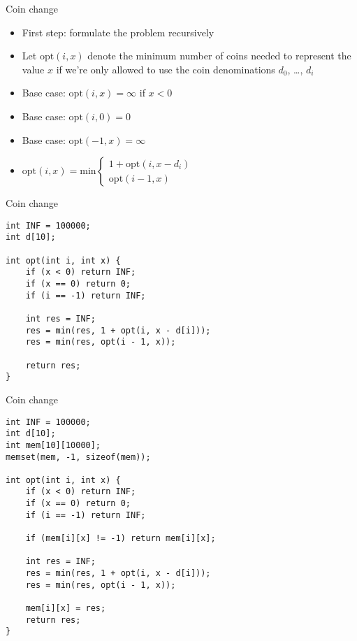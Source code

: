 \documentclass[12pt,t]{beamer}
\newcommand{\bi}{\begin{itemize}}
\newcommand{\ei}{\end{itemize}}
\begin{document}
\begin{frame}{Coin change}
    \bi
        \item First step: formulate the problem recursively
        \vspace{20pt}
\item Let $\mathrm{opt}(i,x)$ denote the minimum number of coins needed to represent the value $x$ if we're only allowed to use the coin denominations $d_0$, \ldots, $d_i$
        \vspace{10pt}
        \item Base case: $\mathrm{opt}(i,x) = \infty$ if $x < 0$
        \item Base case: $\mathrm{opt}(i,0) = 0$
        \item Base case: $\mathrm{opt}(-1,x) = \infty$
        \vspace{10pt}
\item $\mathrm{opt}(i,x) = \mathrm{min} \left\{
	\begin{array}{l}
        1 + \mathrm{opt}(i, x - d_i) \\
        \mathrm{opt}(i-1, x)
	\end{array}
\right.$
    \ei
\end{frame}

\begin{frame}[fragile]{Coin change}
    \begin{verbatim}
int INF = 100000;
int d[10];

int opt(int i, int x) {
    if (x < 0) return INF;
    if (x == 0) return 0;
    if (i == -1) return INF;

    int res = INF;
    res = min(res, 1 + opt(i, x - d[i]));
    res = min(res, opt(i - 1, x));

    return res;
}
    \end{verbatim}
\end{frame}

\begin{frame}[fragile]{Coin change}
    \begin{verbatim}
int INF = 100000;
int d[10];
int mem[10][10000];
memset(mem, -1, sizeof(mem));

int opt(int i, int x) {
    if (x < 0) return INF;
    if (x == 0) return 0;
    if (i == -1) return INF;

    if (mem[i][x] != -1) return mem[i][x];

    int res = INF;
    res = min(res, 1 + opt(i, x - d[i]));
    res = min(res, opt(i - 1, x));

    mem[i][x] = res;
    return res;
}
    \end{verbatim}
\end{frame}
\end{document}
